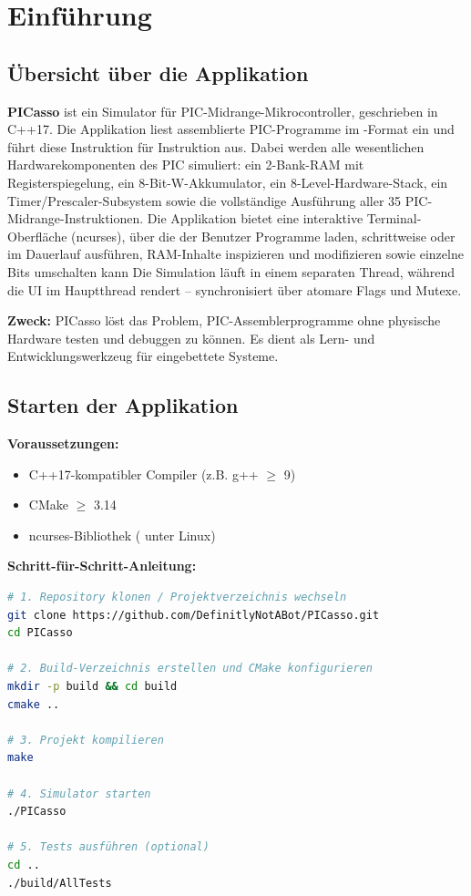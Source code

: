 \chapter{Einführung}

\section{Übersicht über die Applikation}

\textbf{PICasso} ist ein Simulator für PIC-Midrange-Mikrocontroller, geschrieben in C++17.
Die Applikation liest assemblierte PIC-Programme im -Format ein und führt diese Instruktion für Instruktion aus.
Dabei werden alle wesentlichen Hardwarekomponenten des PIC simuliert:
ein 2-Bank-RAM mit Registerspiegelung, ein 8-Bit-W-Akkumulator, ein 8-Level-Hardware-Stack, ein Timer/Prescaler-Subsystem
sowie die vollständige Ausführung aller 35 PIC-Midrange-Instruktionen.
Die Applikation bietet eine interaktive Terminal-Oberfläche (ncurses), über die der Benutzer Programme laden,
schrittweise oder im Dauerlauf ausführen, RAM-Inhalte inspizieren und modifizieren sowie einzelne Bits umschalten kann
Die Simulation läuft in einem separaten Thread, während die UI im Hauptthread rendert -- synchronisiert über atomare Flags und Mutexe.

\textbf{Zweck:} PICasso löst das Problem, PIC-Assemblerprogramme ohne physische Hardware testen und debuggen zu können.
Es dient als Lern- und Entwicklungswerkzeug für eingebettete Systeme.

\section{Starten der Applikation}

\textbf{Voraussetzungen:}

\begin{itemize}
    \item C++17-kompatibler Compiler (z.B. g++ $\geq$ 9)
    \item CMake $\geq$ 3.14
    \item ncurses-Bibliothek ( unter Linux)
\end{itemize}

\textbf{Schritt-für-Schritt-Anleitung:}

\begin{lstlisting}[style=codeblock,language=bash]
# 1. Repository klonen / Projektverzeichnis wechseln
git clone https://github.com/DefinitlyNotABot/PICasso.git
cd PICasso

# 2. Build-Verzeichnis erstellen und CMake konfigurieren
mkdir -p build && cd build
cmake ..

# 3. Projekt kompilieren
make

# 4. Simulator starten
./PICasso

# 5. Tests ausführen (optional)
cd ..
./build/AllTests
\end{lstlisting}

